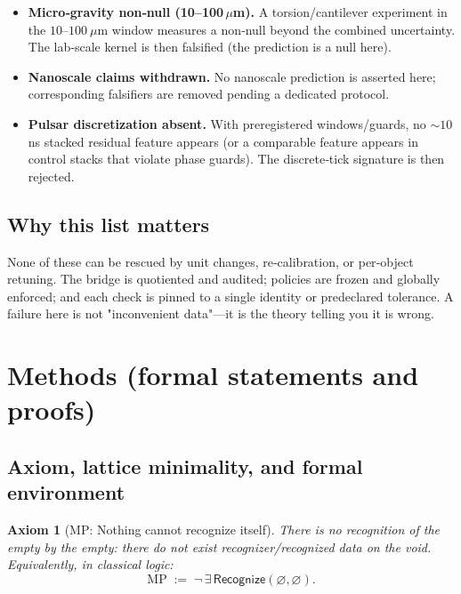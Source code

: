 \documentclass[11pt]{article}
\newtheorem{axiom}{Axiom}
\begin{document}
\begin{itemize}
  \item \textbf{Micro‑gravity non‑null (10–100\,$\mu$m).} A torsion/cantilever experiment in the $10$–$100~\mu$m window measures a non‑null beyond the combined uncertainty. The lab‑scale kernel is then falsified (the prediction is a null here).

  \item \textbf{Nanoscale claims withdrawn.} No nanoscale prediction is asserted here; corresponding falsifiers are removed pending a dedicated protocol.

  \item \textbf{Pulsar discretization absent.} With preregistered windows/guards, no $\sim10$\,ns stacked residual feature appears (or a comparable feature appears in control stacks that violate phase guards). The discrete‑tick signature is then rejected.
\end{itemize}

\subsection{Why this list matters}
None of these can be rescued by unit changes, re‑calibration, or per‑object retuning. The bridge is quotiented and audited; policies are frozen and globally enforced; and each check is pinned to a single identity or predeclared tolerance. A failure here is not "inconvenient data"—it is the theory telling you it is wrong.

\section{Methods (formal statements and proofs)}\label{sec:methods}

\subsection{Axiom, lattice minimality, and formal environment}\label{subsec:axiom-minimality}

\begin{axiom}[MP: Nothing cannot recognize itself]\label{ax:MP}
There is no recognition of the empty by the empty: \emph{there do not exist} recognizer/recognized data on the void. Equivalently, in classical logic:
\[
\text{MP} \;:=\; \neg\,\exists\,\mathsf{Recognize}(\varnothing,\varnothing).
\]
\end{axiom}
% 
\end{document}
